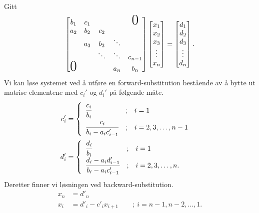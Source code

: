\documentclass[11pt]{article}
\numberwithin{figure}{section} %
\numberwithin{table}{section} %
\begin{document}
Gitt 
\begin{align*}
  \begin{bmatrix}
   {b_1} & {c_1} &  &  & \text{\huge0} \\
   {a_2} & {b_2} & {c_2} &  &  \\
    & {a_3} & {b_3} & \ddots &  \\
    &  & \ddots & \ddots & {c_{n-1}}\\
     \text{\huge0}&  &  & {a_n} & {b_n}\\
\end{bmatrix}
\begin{bmatrix}
   {x_1 }  \\
   {x_2 }  \\
   {x_3 }  \\
   \vdots   \\
   {x_n }  \\
\end{bmatrix}
=
\begin{bmatrix}
   {d_1 }  \\
   {d_2 }  \\
   {d_3 }  \\
   \vdots   \\
   {d_n }  \\
\end{bmatrix}.
\end{align*}
Vi kan løse systemet ved å utføre en forward-substitution bestående av
å bytte ut matrise elementene med $c_i'$ og $d_i'$ på følgende måte.
\begin{align*}
  c_i' &= \begin{cases}
\begin{array}{lcl}
  \cfrac{c_i}{b_i}                  & ; & i = 1 \\
  \cfrac{c_i}{b_i - a_i c'_{i - 1}} & ; & i = 2, 3, \dots, n-1 \\
\end{array}
\end{cases}\\
d_i' &= \begin{cases}
\begin{array}{lcl}
  \cfrac{d_i}{b_i}                  & ; & i = 1 \\
  \cfrac{d_i - a_i d'_{i - 1}}{b_i - a_i c'_{i - 1}} & ; & i = 2, 3, \dots, n. \\
\end{array}
\end{cases}
\end{align*}
Deretter finner vi løsningen ved backward-substitution.
\begin{align*}
  x_n &= d'_n\\
  x_i &= d'_i - c'_i x_{i + 1} \qquad ; \ i = n - 1, n - 2, \ldots, 1.
\end{align*}
\end{document}
